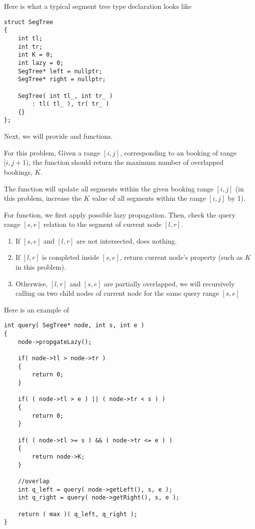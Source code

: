 Here is what a typical segment tree type declaration looks like

\begin{lstlisting}[style=customc]
struct SegTree
{
    int tl;
    int tr;
    int K = 0;
    int lazy = 0;
    SegTree* left = nullptr;
    SegTree* right = nullptr;

    SegTree( int tl_, int tr_ )
        : tl( tl_ ), tr( tr_ )
    {}
};
\end{lstlisting}

Next, we will provide  and  functions.

For this problem, Given a range $[i, j]$, corresponding to an booking of range $[i, j+1)$, the  function should return the maximum number of overlapped bookings, $K$.

The  function will update all segments within the given booking range $[i, j]$ (in this problem, increase the $K$ value of all segments within the range $[i, j]$ by 1).

For  function, we first apply possible lazy propagation. Then, check the query range $[s,e]$ relation to the segment of current node $[l,r]$.

\begin{enumerate}
\item If $[s,e]$ and $[l,r]$ are not intersected, does nothing.
\item If $[l,r]$ is completed inside $[s,e]$, return current node's property (such as $K$ in this problem).
\item Otherwise, $[l,r]$ and $[s,e]$ are partially overlapped, we will recursively calling  on two child nodes of current node for the same query range $[s,e]$
\end{enumerate}

Here is an example of 

\begin{lstlisting}[style=customc]
int query( SegTree* node, int s, int e )
{
    node->propgateLazy();

    if( node->tl > node->tr )
    {
        return 0;
    }

    if( ( node->tl > e ) || ( node->tr < s ) )
    {
        return 0;
    }

    if( ( node->tl >= s ) && ( node->tr <= e ) )
    {
        return node->K;
    }

    //overlap
    int q_left = query( node->getLeft(), s, e );
    int q_right = query( node->getRight(), s, e );

    return ( max )( q_left, q_right );
}
\end{lstlisting}

